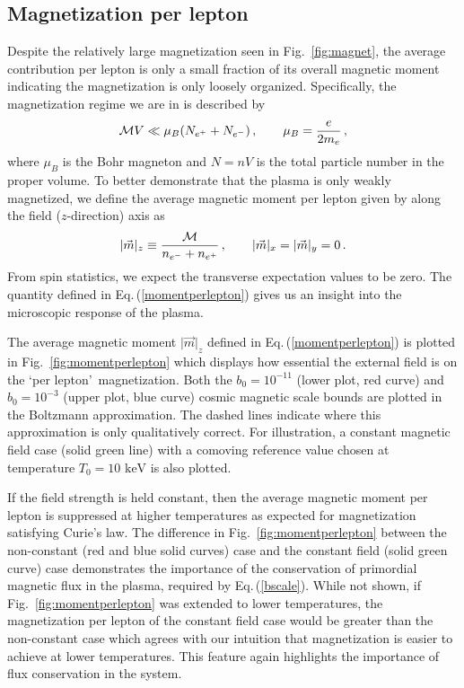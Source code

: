 \documentclass[reprint]{revtex4-2}
\newcommand*{\keV}{\text{ keV}}
\newcommand{\req}[1]{Eq.\,(\ref{#1})}
\newcommand{\rf}[1]{Fig.~{\ref{#1}}}
\begin{document}
\subsection{Magnetization per lepton}
\label{sec:perlepton}
\noindent Despite the relatively large magnetization seen in \rf{fig:magnet}, the average contribution per lepton is only a small fraction of its overall magnetic moment indicating the magnetization is only loosely organized. Specifically, the magnetization regime we are in is described by
\begin{align}
    \label{fractionalmagnetization}
    {\cal M}V\ll\mu_{B}(N_{e^{+}}+N_{e^{-}})\,,\qquad\mu_{B}=\frac{e}{2m_{e}}\,,
\end{align}
where $\mu_{B}$ is the Bohr magneton and $N=nV$ is the total particle number in the proper volume. To better demonstrate that the plasma is only weakly magnetized, we define the average magnetic moment per lepton given by along the field ($z$-direction) axis as
\begin{align}
    \label{momentperlepton}
    \vert\vec{m}\vert_{z}\equiv\frac{{\cal M}}{n_{e^{-}}+n_{e^{+}}}\,,\qquad\vert\vec{m}\vert_{x}=\vert\vec{m}\vert_{y}=0\,.
\end{align}
From spin statistics, we expect the transverse expectation values to be zero. The quantity defined in \req{momentperlepton} gives us an insight into the microscopic response of the plasma.

The average magnetic moment $\vert\vec{m}\vert_{z}$ defined in \req{momentperlepton} is plotted in \rf{fig:momentperlepton} which displays how essential the external field is on the \lq per lepton\rq\ magnetization. Both the $b_{0}=10^{-11}$ (lower plot, red curve) and $b_{0}=10^{-3}$ (upper plot, blue curve) cosmic magnetic scale bounds are plotted in the Boltzmann approximation. The dashed lines indicate where this approximation is only qualitatively correct. For illustration, a constant magnetic field case (solid green line) with a comoving reference value chosen at temperature $T_{0}=10\keV$ is also plotted.

If the field strength is held constant, then the average magnetic moment per lepton is suppressed at higher temperatures as expected for magnetization satisfying Curie's law. The difference in \rf{fig:momentperlepton} between the non-constant (red and blue solid curves) case and the constant field (solid green curve) case demonstrates the importance of the conservation of primordial magnetic flux in the plasma, required by \req{bscale}. While not shown, if \rf{fig:momentperlepton} was extended to lower temperatures, the magnetization per lepton of the constant field case would be greater than the non-constant case which agrees with our intuition that magnetization is easier to achieve at lower temperatures. This feature again highlights the importance of flux conservation in the system.
\end{document}
